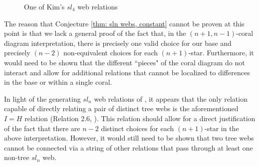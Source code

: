 \documentclass[documentfleqn,12pt]{amsart}
\begin{document}
\begin{figure}[h!]
\hspace{.15in}
\raisebox{30pt}{\scalebox{1.5}{$\cong$}}
\hspace{.15in}
\caption{One of Kim's $sl_4$ web relations}
\label{fig: sl4 web relation}
\end{figure}

The reason that Conjecture \ref{thm: sln webs, constant} cannot be proven at this point is that we lack a general proof of the fact that, in the $(n+1,n-1)$-coral diagram interpretation, there is precisely one valid choice for our base and precisely $(n-2)$ non-equivalent choices for each $(n+1)$-star.  Furthermore, it would need to be shown that the different ``pieces" of the coral diagram do not interact and allow for additional relations  that cannot be localized to differences in the base or within a single coral.

In light of the generating $sl_n$ web relations of \cite{CKM}, it appears that the only relation capable of directly relating a pair of distinct tree webs is the aforementioned $I = H$ relation (Relation 2.6, \cite{CKM}).  This relation should allow for a direct justification of the fact that there are $n-2$ distinct choices for each $(n+1)$-star in the above interpretation.  However, it would still need to be shown that two tree webs cannot be connected via a string of other relations that pass through at least one non-tree $sl_n$ web.

\end{document}
